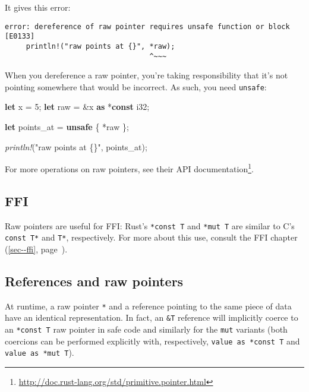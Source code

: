 \documentclass[a4paper,]{book}
\renewcommand*{\hyperlink}[2]{%
 #2 (\autoref{#1}, page~\pageref{#1})}
\newenvironment{Shaded}{\begin{snugshade}}{\end{snugshade}}
\newcommand{\KeywordTok}[1]{\textcolor[rgb]{0.13,0.29,0.53}{\textbf{{#1}}}}
\newcommand{\DataTypeTok}[1]{\textcolor[rgb]{0.13,0.29,0.53}{{#1}}}
\newcommand{\DecValTok}[1]{\textcolor[rgb]{0.00,0.00,0.81}{{#1}}}
\newcommand{\StringTok}[1]{\textcolor[rgb]{0.31,0.60,0.02}{{#1}}}
\newcommand{\PreprocessorTok}[1]{\textcolor[rgb]{0.56,0.35,0.01}{\textit{{#1}}}}
\newcommand{\NormalTok}[1]{{#1}}
\renewcommand{\href}[2]{#2\footnote{\url{#1}}}
\begin{document}
It gives this error:

\begin{verbatim}
error: dereference of raw pointer requires unsafe function or block [E0133]
     println!("raw points at {}", *raw);
                                  ^~~~
\end{verbatim}

When you dereference a raw pointer, you're taking responsibility that
it's not pointing somewhere that would be incorrect. As such, you need
\texttt{unsafe}:

\begin{Shaded}
\begin{Highlighting}[]
\KeywordTok{let} \NormalTok{x = }\DecValTok{5}\NormalTok{;}
\KeywordTok{let} \NormalTok{raw = &x }\KeywordTok{as} \NormalTok{*}\KeywordTok{const} \DataTypeTok{i32}\NormalTok{;}

\KeywordTok{let} \NormalTok{points_at = }\KeywordTok{unsafe} \NormalTok{\{ *raw \};}

\PreprocessorTok{println!}\NormalTok{(}\StringTok{"raw points at \{\}"}\NormalTok{, points_at);}
\end{Highlighting}
\end{Shaded}

For more operations on raw pointers, see
\href{http://doc.rust-lang.org/std/primitive.pointer.html}{their API
documentation}.

\subsection{FFI}\label{ffi}

Raw pointers are useful for FFI: Rust's \texttt{*const\ T} and
\texttt{*mut\ T} are similar to C's \texttt{const\ T*} and \texttt{T*},
respectively. For more about this use, consult the
\protect\hyperlink{sec--ffi}{FFI chapter}.

\subsection{References and raw
pointers}\label{references-and-raw-pointers}

At runtime, a raw pointer \texttt{*} and a reference pointing to the
same piece of data have an identical representation. In fact, an
\texttt{\&T} reference will implicitly coerce to an \texttt{*const\ T}
raw pointer in safe code and similarly for the \texttt{mut} variants
(both coercions can be performed explicitly with, respectively,
\texttt{value\ as\ *const\ T} and \texttt{value\ as\ *mut\ T}).
\end{document}
